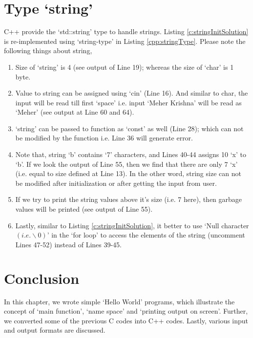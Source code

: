 

\section{Type `string'}
C++ provide the `std::string' type to handle strings. Listing \ref{c:stringInitSolution} is re-implemented using `string-type' in Listing \ref{cpp:stringType}. Please note the following things about string, 

\begin{enumerate}
	\item Size of `string' is 4 (see output of Line 19); whereas the size of `char' is 1 byte.
	\item Value to string can be assigned using `cin' (Line 16). And similar to char, the input will be read till first `space' i.e. input `Meher Krishna' will be read as `Meher' (see output at Line 60 and 64). 
	\item `string' can be passed to function as `const' as well (Line 28); which can not be modified by the function i.e. Line 36 will generate error. 
	\item Note that, string `b' contains `7' characters, and Lines 40-44 assigns 10 `x' to `b'. If we look the output of Line 55, then we find that there are only 7 `x' (i.e. equal to size defined at Line 13). In the other word, string size can not be modified after initialization or after getting the input from user. 
	\item If we try to print the string values above it's size (i.e. 7 here), then garbage values will be printed (see output of Line 55). 
	\item Lastly, similar to Listing \ref{c:stringInitSolution},  it better to use `Null character $(i.e. \backslash 0)$' in the `for loop' to access the elements of the string (uncomment Lines 47-52) instead of Lines 39-45. 
\end{enumerate}




\section{Conclusion}
In this chapter, we wrote simple `Hello World' programs, which illustrate the concept of `main function', `name space' and `printing output on screen'. Further, we converted some of the previous C codes into C++ codes. Lastly, various input and output formats are discussed. 
